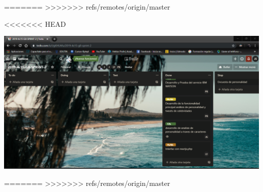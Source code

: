 =======
>>>>>>> refs/remotes/origin/master

<<<<<<< HEAD

\centering
\includegraphics[width=1.20\textwidth]{img/img2}\par\vspace{1cm}
\vspace{0.30cm}	



=======
>>>>>>> refs/remotes/origin/master


